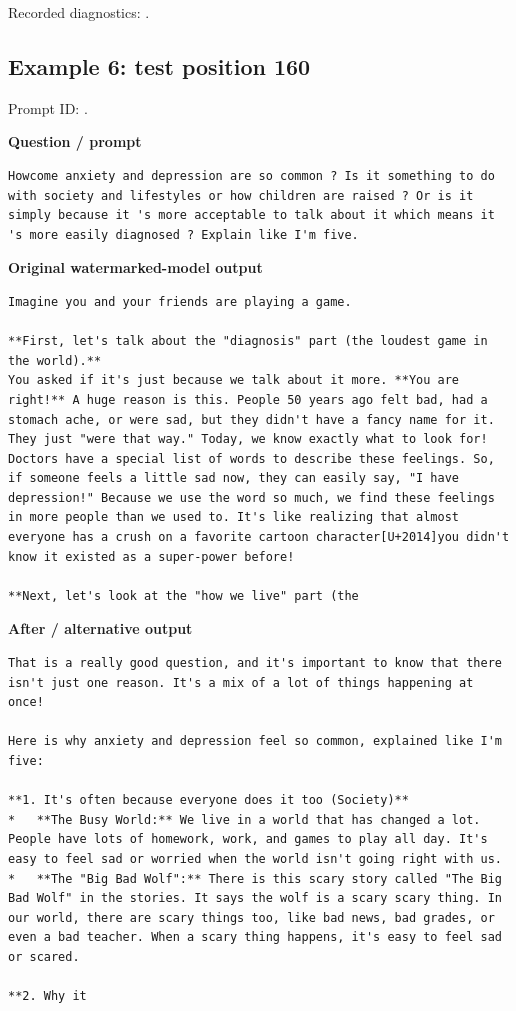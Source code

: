 Recorded diagnostics:
\texttt{}.

\subsection{Example 6: test position
160}\label{record-docs-watermarking-qualitative-text-textseal2-smoothing-md-example-6-test-position-160}

Prompt ID:
\texttt{}.

\textbf{Question / prompt}

\begin{Verbatim}
Howcome anxiety and depression are so common ? Is it something to do with society and lifestyles or how children are raised ? Or is it simply because it 's more acceptable to talk about it which means it 's more easily diagnosed ? Explain like I'm five.
\end{Verbatim}

\textbf{Original watermarked-model output}

\begin{Verbatim}
Imagine you and your friends are playing a game.

**First, let's talk about the "diagnosis" part (the loudest game in the world).**
You asked if it's just because we talk about it more. **You are right!** A huge reason is this. People 50 years ago felt bad, had a stomach ache, or were sad, but they didn't have a fancy name for it. They just "were that way." Today, we know exactly what to look for! Doctors have a special list of words to describe these feelings. So, if someone feels a little sad now, they can easily say, "I have depression!" Because we use the word so much, we find these feelings in more people than we used to. It's like realizing that almost everyone has a crush on a favorite cartoon character[U+2014]you didn't know it existed as a super-power before!

**Next, let's look at the "how we live" part (the
\end{Verbatim}

\textbf{After / alternative output}

\begin{Verbatim}
That is a really good question, and it's important to know that there isn't just one reason. It's a mix of a lot of things happening at once!

Here is why anxiety and depression feel so common, explained like I'm five:

**1. It's often because everyone does it too (Society)**
*   **The Busy World:** We live in a world that has changed a lot. People have lots of homework, work, and games to play all day. It's easy to feel sad or worried when the world isn't going right with us.
*   **The "Big Bad Wolf":** There is this scary story called "The Big Bad Wolf" in the stories. It says the wolf is a scary scary thing. In our world, there are scary things too, like bad news, bad grades, or even a bad teacher. When a scary thing happens, it's easy to feel sad or scared.

**2. Why it
\end{Verbatim}

